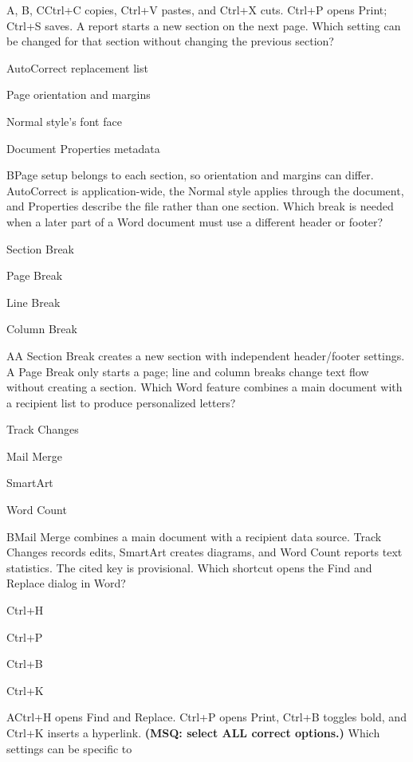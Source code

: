 \begin{enumerate}[label=\textbf{Q\arabic*.}, leftmargin=*]
  {A, B, C}{Ctrl+C copies, Ctrl+V pastes, and Ctrl+X cuts. Ctrl+P opens Print; Ctrl+S saves.}
\fi
\ifnum{}
  {A report starts a new section on the next page. Which setting can be changed
  for that section without changing the previous section?}
  {\item AutoCorrect replacement list
   \item Page orientation and margins
   \item Normal style's font face
   \item Document Properties metadata}
  {B}{Page setup belongs to each section, so orientation and margins can differ.
  AutoCorrect is application-wide, the Normal style applies through the document,
  and Properties describe the file rather than one section.}
  {Which break is needed when a later part of a Word document must use a different
  header or footer?}
  {\item Section Break
   \item Page Break
   \item Line Break
   \item Column Break}
  {A}{A Section Break creates a new section with independent header/footer
  settings. A Page Break only starts a page; line and column breaks change text
  flow without creating a section.}
  {Which Word feature combines a main document with a recipient list to produce
  personalized letters?}
  {\item Track Changes
   \item Mail Merge
   \item SmartArt
   \item Word Count}
  {B}{Mail Merge combines a main document with a recipient data source. Track
  Changes records edits, SmartArt creates diagrams, and Word Count reports text
  statistics. The cited key is provisional.}
\JKSSBItem{[Original]}
  {Which shortcut opens the Find and Replace dialog in Word?}
  {\item Ctrl+H
   \item Ctrl+P
   \item Ctrl+B
   \item Ctrl+K}
  {A}{Ctrl+H opens Find and Replace. Ctrl+P opens Print, Ctrl+B toggles bold, and
  Ctrl+K inserts a hyperlink.}
  {\textbf{(MSQ: select ALL correct options.)} Which settings can be specific to
}
\end{enumerate}
